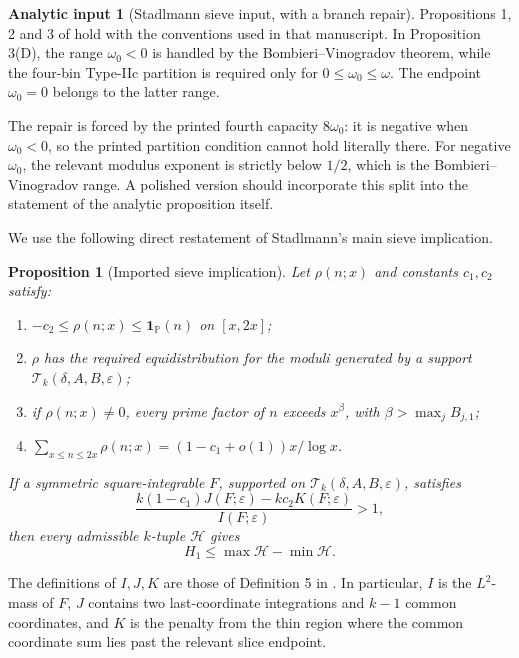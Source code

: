 \documentclass[11pt]{article}
\newtheorem{proposition}[theorem]{Proposition}
\theoremstyle{definition}
\newtheorem{hypothesis}[theorem]{Analytic input}
\theoremstyle{remark}
\newcommand{\one}{\mathbf 1}
\newcommand{\TT}{\mathcal T}
\newcommand{\eps}{\varepsilon}
\begin{document}
\begin{hypothesis}[Stadlmann sieve input, with a branch repair]
\label{hyp:analytic}
Propositions 1, 2 and 3 of \cite{Stadlmann2026} hold with the conventions used
in that manuscript.  In Proposition 3(D), the range \(\omega_0<0\) is handled
by the Bombieri--Vinogradov theorem, while the four-bin Type-IIc partition is
required only for \(0\leq\omega_0\leq\omega\).  The endpoint
\(\omega_0=0\) belongs to the latter range.
\end{hypothesis}

The repair is forced by the printed fourth capacity \(8\omega_0\): it is
negative when \(\omega_0<0\), so the printed partition condition cannot hold
literally there.  For negative \(\omega_0\), the relevant modulus exponent is
strictly below \(1/2\), which is the Bombieri--Vinogradov range.  A polished
version should incorporate this split into the statement of the analytic
proposition itself.

We use the following direct restatement of Stadlmann's main sieve implication.

\begin{proposition}[Imported sieve implication]
\label{prop:imported}
Let \(\rho(n;x)\) and constants \(c_1,c_2\) satisfy:
\begin{enumerate}
  \item \(-c_2\leq\rho(n;x)\leq\one_{\mathbb P}(n)\) on \([x,2x]\);
  \item \(\rho\) has the required equidistribution for the moduli generated by
        a support \(\TT_k(\delta,A,B,\eps)\);
  \item if \(\rho(n;x)\neq0\), every prime factor of \(n\) exceeds
        \(x^\beta\), with \(\beta>\max_j B_{j,1}\);
  \item \(\sum_{x\leq n\leq2x}\rho(n;x)=(1-c_1+o(1))x/\log x\).
\end{enumerate}
If a symmetric square-integrable \(F\), supported on
\(\TT_k(\delta,A,B,\eps)\), satisfies
\begin{equation}
\label{eq:sieve-ratio}
  \frac{k(1-c_1)J(F;\eps)-k c_2K(F;\eps)}{I(F;\eps)}>1,
\end{equation}
then every admissible \(k\)-tuple \(\mathcal H\) gives
\[
  H_1\leq \max\mathcal H-\min\mathcal H.
\]
\end{proposition}

The definitions of \(I,J,K\) are those of Definition 5 in
\cite{Stadlmann2026}.  In particular, \(I\) is the \(L^2\)-mass of \(F\),
\(J\) contains two last-coordinate integrations and \(k-1\) common
coordinates, and \(K\) is the penalty from the thin region where the common
coordinate sum lies past the relevant slice endpoint.
\end{document}
